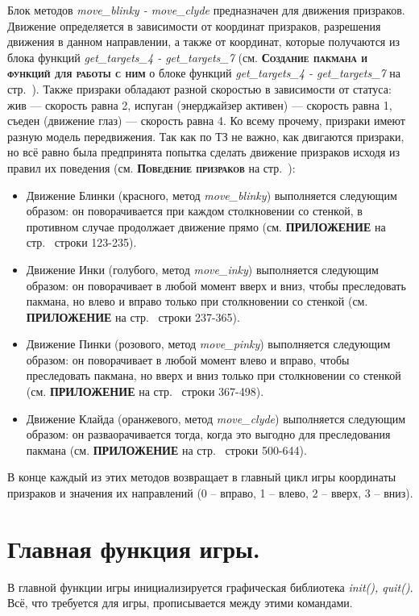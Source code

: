Блок методов \textit{move\_blinky - move\_clyde} предназначен для движения призраков. Движение определяется в зависимости от координат призраков, разрешения движения в данном направлении, а также от координат, которые получаются из блока функций \textit{get\_targets\_4 - get\_targets\_7} (см. \textbf{\textsc{Создание пакмана и функций для работы с ним}} о блоке функций \textit{get\_targets\_4 - get\_targets\_7} на стр.~\pageref{sec:ch02/sec01/sub05}). Также призраки обладают разной скоростью в зависимости от статуса: жив --- скорость равна 2, испуган (энерджайзер активен) --- скорость равна 1, съеден (движение глаз) --- скорость равна 4. Ко всему прочему, призраки имеют разную модель передвижения. Так как по ТЗ не важно, как двигаются призраки, но всё равно была предпринята попытка сделать движение призраков исходя из правил их поведения (см. \textbf{\textsc{Поведение призраков}} на стр.~\pageref{subsec:ch01/sec04/subsec03}):
\begin{itemize}
	\item Движение Блинки (красного, метод \textit{move\_blinky}) выполняется следующим образом: он поворачивается при каждом столкновении со стенкой, в противном случае
	продолжает движение прямо (см. \textbf{\textsc{ПРИЛОЖЕНИЕ}} на стр.~\pageref{code:ghost} строки 123-235).
	\item Движение Инки (голубого, метод \textit{move\_inky}) выполняется следующим образом: он поворачивает в любой момент вверх и вниз, чтобы преследовать пакмана, но влево и вправо только при столкновении со стенкой (см. \textbf{\textsc{ПРИЛОЖЕНИЕ}} на стр.~\pageref{code:ghost} строки 237-365).
	\item Движение Пинки (розового, метод \textit{move\_pinky}) выполняется следующим образом: он поворачивает в любой момент влево и вправо, чтобы преследовать пакмана, но вверх и вниз только при столкновении со стенкой (см. \textbf{\textsc{ПРИЛОЖЕНИЕ}} на стр.~\pageref{code:ghost} строки 367-498).
	\item Движение Клайда (оранжевого, метод \textit{move\_clyde}) выполняется следующим образом: он разваорачивается тогда, когда это выгодно для преследования пакмана (см. \textbf{\textsc{ПРИЛОЖЕНИЕ}} на стр.~\pageref{code:ghost} строки 500-644).
\end{itemize}

В конце каждый из этих методов возвращает в главный цикл игры координаты призраков и значения их направлений (0 -- вправо, 1 -- влево, 2 -- вверх, 3 -- вниз).

\section{\label{sec:ch02/sec01/sub07}Главная функция игры.}
В главной функции игры инициализируется графическая библиотека \textit{init(), quit()}. Всё, что требуется для игры, прописывается между этими командами.


